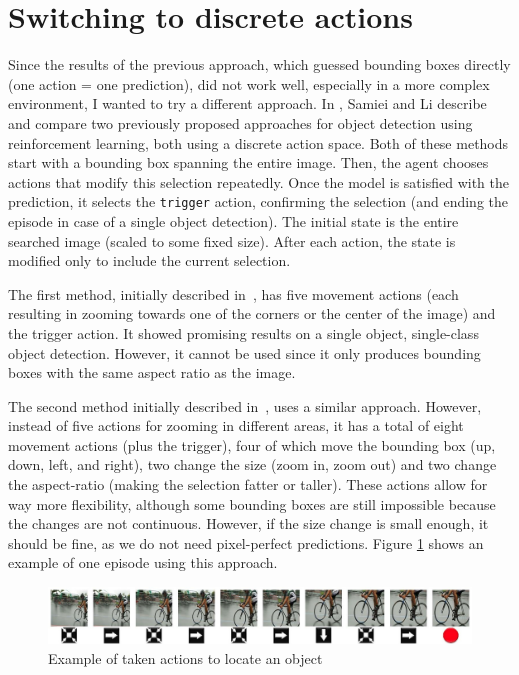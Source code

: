 \documentclass[
  digital,     %
  oneside,     %
  nosansbold,  %
  nocolorbold, %
  lof,         %
  lot,         %
]{fithesis4}
\begin{document}
\section{Switching to discrete actions}
\label{sec:iterative}

Since the results of the previous approach, which guessed bounding boxes directly (one action = one prediction), did not work well, especially in a more complex environment, I wanted to try a different approach. In \cite{rl_object_detection}, Samiei and Li describe and compare two previously proposed approaches for object detection using reinforcement learning, both using a discrete action space. Both of these methods start with a bounding box spanning the entire image. Then, the agent chooses actions that modify this selection repeatedly. Once the model is satisfied with the prediction,  it selects the \texttt{trigger} action, confirming the selection (and ending the episode in case of a single object detection). The initial state is the entire searched image (scaled to some fixed size). After each action, the state is modified only to include the current selection.

The first method, initially described in~\cite{hierarchical_od_with_drl}, has five movement actions (each resulting in zooming towards one of the corners or the center of the image) and the trigger action. It showed promising results on a single object, single-class object detection. However, it cannot be used since it only produces bounding boxes with the same aspect ratio as the image.

The second method initially described in~\cite{iterative_od_with_rl}, uses a similar approach. However, instead of five actions for zooming in different areas, it has a total of eight movement actions (plus the trigger), four of which move the bounding box (up, down, left, and right), two change the size (zoom in, zoom out) and two change the aspect-ratio (making the selection fatter or taller). These actions allow for way more flexibility, although some bounding boxes are still impossible because the changes are not continuous. However, if the size change is small enough, it should be fine, as we do not need pixel-perfect predictions. Figure \ref{fig:exmaple_from_paper} shows an example of one episode using this approach.

\begin{figure}
    \centering
    \includegraphics[width=1\linewidth]{diagrams/45.jpg}
    \caption{Example of taken actions to locate an object~\cite{iterative_od_with_rl}}
    \label{fig:exmaple_from_paper}
\end{figure}
\end{document}
